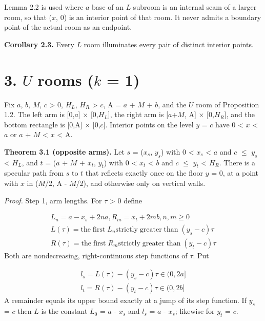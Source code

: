 \documentclass[11pt]{article}
\begin{document}
Lemma 2.2 is used where \(a\) base of an \(L\) subroom is an internal seam of a larger room, so that (\(x\), 0) is an interior point of that room. It never admits a boundary point of the actual room as an endpoint.

\textbf{Corollary 2.3.} Every \(L\) room illuminates every pair of distinct interior points.

\section*{3. \(U\) rooms (\(k\) = 1)}
Fix \(a\), \(b\), \(M\), \(c\) > 0, \(H_{L}\), \(H_{R}\) > \(c\), A = \(a\) + \(M\) + \(b\), and the \(U\) room of Proposition 1.2. The left arm is [0,\(a\)] \(\times\) [0,\(H_{L}\)], the right arm is [\(a\)+\(M\), A] \(\times\) [0,\(H_{R}\)], and the bottom rectangle is [0,A] \(\times\) [0,\(c\)]. Interior points on the level \(y\) = \(c\) have 0 < \(x\) < \(a\) or \(a\) + \(M\) < \(x\) < A.

\textbf{Theorem 3.1 (opposite arms).} Let \(s\) = (\(x_{s}\), \(y_{s}\)) with 0 < \(x_{s}\) < \(a\) and \(c\) \(\le\) \(y_{s}\) < \(H_{L}\), and \(t\) = (\(a\) + \(M\) + \(x_{t}\), \(y_{t}\)) with 0 < \(x_{t}\) < \(b\) and \(c\) \(\le\) \(y_{t}\) < \(H_{R}\). There is a specular path from \(s\) to \(t\) that reflects exactly once on the floor \(y\) = 0, at a point with \(x\) in (\(M\)/2, A - \(M\)/2), and otherwise only on vertical walls.

\emph{Proof.} Step 1, arm lengths. For \(\tau\) > 0 define

\begin{gather*}
L_{n} = a - x_{s} + 2na,   R_{m} = x_{t} + 2mb,   n, m \ge  0 \\
L(\tau) = \text{the}\; \text{first}\; L_{n} \text{strictly}\; \text{greater}\; \text{than}\; (y_{s} - c) \tau \\
R(\tau) = \text{the}\; \text{first}\; R_{m} \text{strictly}\; \text{greater}\; \text{than}\; (y_{t} - c) \tau
\end{gather*}
Both are nondecreasing, right-continuous step functions of \(\tau\). Put

\begin{gather*}
l_{s} = L(\tau) - (y_{s} - c) \tau \in (0, 2a] \\
l_{t} = R(\tau) - (y_{t} - c) \tau \in (0, 2b]
\end{gather*}
A remainder equals its upper bound exactly at a jump of its step function. If \(y_{s}\) = \(c\) then \(L\) is the constant \(L_{0}\) = \(a\) - \(x_{s}\) and \(l_{s}\) = \(a\) - \(x_{s}\); likewise for \(y_{t}\) = \(c\).
\end{document}
